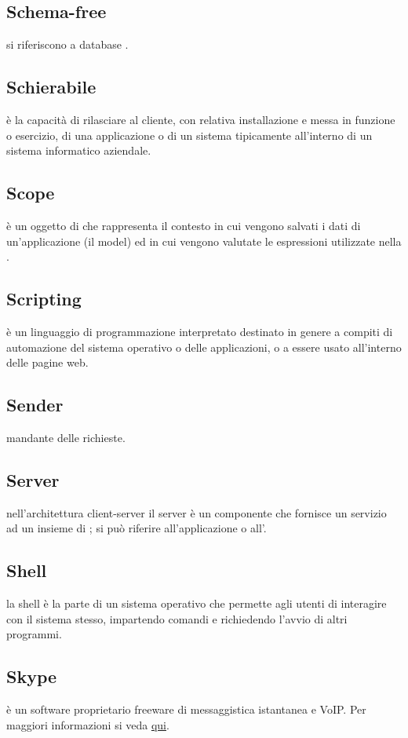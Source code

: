 \documentclass[12pt,a4paper]{article}
\begin{document}
\subsection{Schema-free} 
si riferiscono a database .

\subsection{Schierabile} 
è la capacità di rilasciare al cliente, con relativa installazione e messa in funzione o esercizio, di una applicazione o di un sistema  tipicamente all'interno di un sistema informatico aziendale.

\subsection{Scope}
è un oggetto di  che rappresenta il contesto in cui vengono salvati i dati di un’applicazione (il model) ed in cui vengono valutate le espressioni utilizzate nella .

\subsection{Scripting} 
è un linguaggio di programmazione interpretato destinato in genere a compiti di automazione del sistema operativo o delle applicazioni, o a essere usato all'interno delle pagine web.

\subsection{Sender} 
mandante delle richieste.

\subsection{Server} 
nell'architettura client-server il server è un componente che fornisce un servizio ad un insieme di ; si può riferire all'applicazione o all'.

\subsection{Shell}
la shell è la parte di un sistema operativo che permette agli utenti di interagire con il sistema stesso, impartendo comandi e richiedendo l'avvio di altri programmi.

\subsection{Skype} 
è un software proprietario freeware di messaggistica istantanea e VoIP. Per maggiori informazioni si veda \href{https://it.wikipedia.org/wiki/Skype}{qui}.
\end{document}
